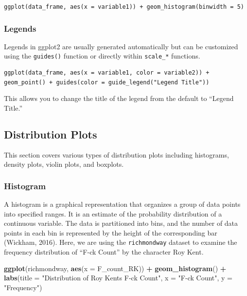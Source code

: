 \documentclass[
  b5paper]{book}
\newenvironment{Shaded}{\begin{snugshade}}{\end{snugshade}}
\newcommand{\AttributeTok}[1]{\textcolor[rgb]{0.13,0.29,0.53}{#1}}
\newcommand{\FunctionTok}[1]{\textcolor[rgb]{0.13,0.29,0.53}{\textbf{#1}}}
\newcommand{\NormalTok}[1]{#1}
\newcommand{\SpecialCharTok}[1]{\textcolor[rgb]{0.81,0.36,0.00}{\textbf{#1}}}
\newcommand{\StringTok}[1]{\textcolor[rgb]{0.31,0.60,0.02}{#1}}
\begin{document}
\begin{verbatim}
ggplot(data_frame, aes(x = variable1)) + geom_histogram(binwidth = 5)
\end{verbatim}

\hypertarget{legends}{%
\subsubsection*{Legends}\label{legends}}

Legends in ggplot2 are usually generated automatically but can be customized using the \texttt{guides()} function or directly within \texttt{scale\_*} functions.

\begin{verbatim}
ggplot(data_frame, aes(x = variable1, color = variable2)) + geom_point() + guides(color = guide_legend("Legend Title"))
\end{verbatim}

This allows you to change the title of the legend from the default to ``Legend Title.''

\hypertarget{distribution-plots}{%
\subsection*{Distribution Plots}\label{distribution-plots}}

This section covers various types of distribution plots including histograms, density plots, violin plots, and boxplots.

\hypertarget{histogram}{%
\subsubsection*{Histogram}\label{histogram}}

A histogram is a graphical representation that organizes a group of data points into specified ranges. It is an estimate of the probability distribution of a continuous variable. The data is partitioned into bins, and the number of data points in each bin is represented by the height of the corresponding bar (Wickham, 2016). Here, we are using the \texttt{richmondway} dataset to examine the frequency distribution of ``F-ck Count'' by the character Roy Kent.

\begin{Shaded}
\begin{Highlighting}[]
\FunctionTok{ggplot}\NormalTok{(richmondway, }\FunctionTok{aes}\NormalTok{(}\AttributeTok{x =}\NormalTok{ F\_count\_RK)) }\SpecialCharTok{+}
  \FunctionTok{geom\_histogram}\NormalTok{() }\SpecialCharTok{+}
  \FunctionTok{labs}\NormalTok{(}\AttributeTok{title =} \StringTok{"Distribution of Roy Kent\textquotesingle{}s F{-}ck Count"}\NormalTok{,}
       \AttributeTok{x =} \StringTok{"F{-}ck Count"}\NormalTok{,}
       \AttributeTok{y =} \StringTok{"Frequency"}\NormalTok{)}
\end{Highlighting}
\end{Shaded}
\end{document}
